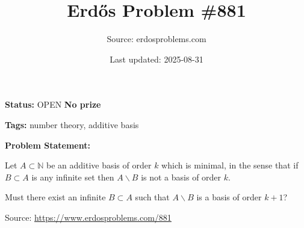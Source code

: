 \documentclass{article}
\title{Erd\H{o}s Problem \#881}
\date{Last updated: 2025-08-31}
\author{Source: erdosproblems.com}
\begin{document}
\maketitle

\noindent\textbf{Status:} OPEN \quad \textbf{No prize}

\noindent\textbf{Tags:} number theory, additive basis

\medskip
\noindent\textbf{Problem Statement:}

Let $A\subset\mathbb{N}$ be an additive basis of order $k$ which is minimal, in the sense that if $B\subset A$ is any infinite set then $A\backslash B$ is not a basis of order $k$. 

Must there exist an infinite $B\subset A$ such that $A\backslash B$ is a basis of order $k+1$?

\bigskip
\noindent\small{Source: \url{https://www.erdosproblems.com/881}}
\end{document}
